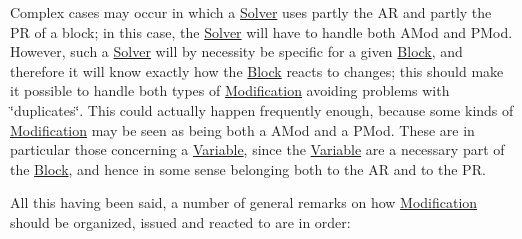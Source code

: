 Complex cases may occur in which a \mbox{\hyperlink{class_s_m_spp__di__unipi__it_1_1_solver}{Solver}} uses partly the AR and partly the PR of a block; in this case, the \mbox{\hyperlink{class_s_m_spp__di__unipi__it_1_1_solver}{Solver}} will have to handle both A\+Mod and P\+Mod. However, such a \mbox{\hyperlink{class_s_m_spp__di__unipi__it_1_1_solver}{Solver}} will by necessity be specific for a given \mbox{\hyperlink{class_s_m_spp__di__unipi__it_1_1_block}{Block}}, and therefore it will know exactly how the \mbox{\hyperlink{class_s_m_spp__di__unipi__it_1_1_block}{Block}} reacts to changes; this should make it possible to handle both types of \mbox{\hyperlink{class_s_m_spp__di__unipi__it_1_1_modification}{Modification}} avoiding problems with \char`\"{}duplicates\char`\"{}. This could actually happen frequently enough, because some kinds of \mbox{\hyperlink{class_s_m_spp__di__unipi__it_1_1_modification}{Modification}} may be seen as being both a A\+Mod and a P\+Mod. These are in particular those concerning a \mbox{\hyperlink{class_s_m_spp__di__unipi__it_1_1_variable}{Variable}}, since the \mbox{\hyperlink{class_s_m_spp__di__unipi__it_1_1_variable}{Variable}} are a necessary part of the \mbox{\hyperlink{class_s_m_spp__di__unipi__it_1_1_block}{Block}}, and hence in some sense belonging both to the AR and to the PR.

All this having been said, a number of general remarks on how \mbox{\hyperlink{class_s_m_spp__di__unipi__it_1_1_modification}{Modification}} should be organized, issued and reacted to are in order\+:


